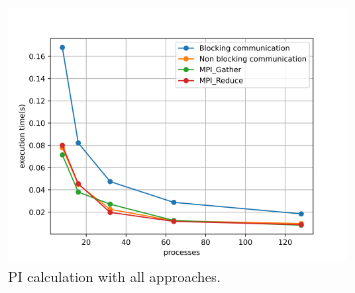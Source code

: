 \documentclass[12pt]{article}
\begin{document}
\begin{figure}[H]
  \centering
  \includegraphics[width=0.8\textwidth]{all.png}
  \caption{PI calculation with all approaches.}
  \label{fig:blocking}
\end{figure}
\end{document}
